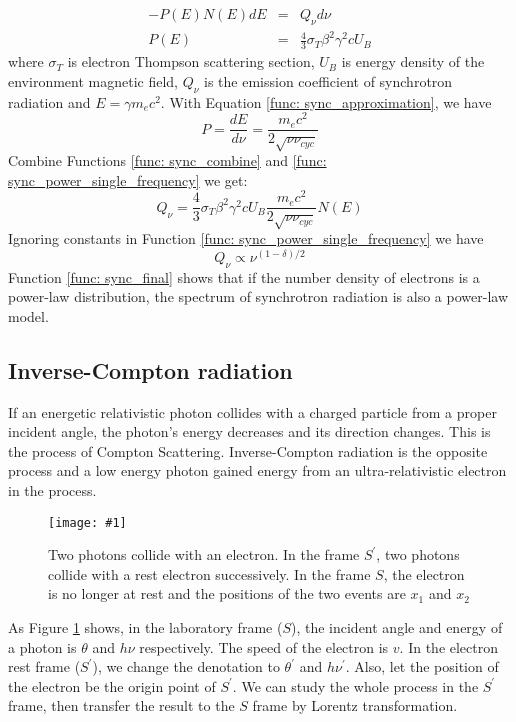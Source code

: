 \documentclass[12pt]{report}
\newcommand{\singleFig}[3]{
  \begin{figure}[!htp]
    \centering
    \texttt{[image: \#1]}
    \caption{#3}
    \label{fig: #1}
  \end{figure}
}
\begin{document}
      \begin{eqnarray}
        \label{func: sync_power_single_frequency}
        -P\left(E\right)N\left(E\right)dE &=& Q_{\nu} d\nu\\
        P\left(E\right) &=& \frac{4}{3} \sigma_{T} \beta^2 \gamma^2 c U_B
      \end{eqnarray} 
      where $\sigma_{T}$ is electron Thompson scattering section, $U_B$ is energy 
      density of the environment magnetic field, $Q_{\nu}$ is the emission coefficient 
      of synchrotron radiation and $E=\gamma m_e c^2$. With Equation 
      \ref{func: sync_approximation}, we have
      \begin{equation}
        \label{func: sync_combine}
        P = \frac{dE}{d\nu} = \frac{m_e c^2}{2\sqrt{\nu \nu_{cyc}}}
      \end{equation}
      Combine Functions \ref{func: sync_combine} and 
      \ref{func: sync_power_single_frequency} we get:
      \begin{equation}
        Q_{\nu} = \frac{4}{3} \sigma_{T} \beta^2 \gamma^2 c U_B \frac{m_e c^2}{2\sqrt{\nu \nu_{cyc}}} N\left(E\right)
      \end{equation}
      Ignoring constants in Function \ref{func: sync_power_single_frequency} we have 
      \begin{equation}
        \label{func: sync_final}
        Q_{\nu} \propto \nu^{(1-\delta)/2}
      \end{equation}
      Function \ref{func: sync_final} shows that if the number density of electrons is 
      a power-law distribution, the spectrum of synchrotron radiation is also a 
      power-law model.  
            
    \subsection{Inverse-Compton radiation}
      If an energetic relativistic photon collides with a charged particle from a 
      proper incident angle, the photon's energy decreases and its direction changes. 
      This is the process of Compton Scattering. Inverse-Compton radiation is the 
      opposite process and a low energy photon gained energy from an ultra-relativistic 
      electron in the process. 

      \singleFig{inverse_compton}{0.45}{Two photons collide with an 
      electron. In the frame $S^{\prime}$, two photons collide with a rest electron 
      successively. In the frame $S$, the electron is no longer at rest and the 
      positions of the two events are $x_1$ and $x_2$}
      As Figure \ref{fig: inverse_compton} shows, in the laboratory frame ($S$), the 
      incident angle and energy of a photon is $\theta$ and $h \nu$ respectively. 
      The speed of the electron is $v$. In the electron rest frame ($S^{\prime}$), 
      we change the denotation to $\theta^{\prime}$ and $h \nu^{\prime}$. Also, let 
      the position of the electron be the origin point of $S^{\prime}$. We can study 
      the whole process in the $S^{\prime}$ frame, then transfer the result to the $S$ 
      frame by Lorentz transformation. 
\end{document}
